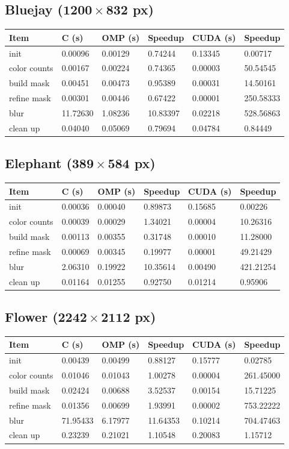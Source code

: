 \documentclass[12pt]{article}
\begin{document}
\subsection{Bluejay ($\mathbf{1200 \times 832}$ px)}

\begin{tabular}{l|l|l|l|l|l}
    Item & C (s) & OMP (s) & Speedup & CUDA (s) & Speedup
\\  \hline
    init & 0.00096 & 0.00129 & 0.74244 & 0.13345 & 0.00717
\\  color counts & 0.00167 & 0.00224 & 0.74365 & 0.00003 & 50.54545
\\  build mask & 0.00451 & 0.00473 & 0.95389 & 0.00031 & 14.50161
\\  refine mask & 0.00301 & 0.00446 & 0.67422 & 0.00001 & 250.58333
\\  blur & 11.72630 & 1.08236 & 10.83397 & 0.02218 & 528.56863
\\  clean up & 0.04040 & 0.05069 & 0.79694 & 0.04784 & 0.84449
\end{tabular}

\subsection{Elephant ($\mathbf{389 \times 584}$ px)}

\begin{tabular}{l|l|l|l|l|l}
    Item & C (s) & OMP (s) & Speedup & CUDA (s) & Speedup
\\  \hline
    init & 0.00036 & 0.00040 & 0.89873 & 0.15685 & 0.00226
\\  color counts & 0.00039 & 0.00029 & 1.34021 & 0.00004 & 10.26316
\\  build mask & 0.00113 & 0.00355 & 0.31748 & 0.00010 & 11.28000
\\  refine mask & 0.00069 & 0.00345 & 0.19977 & 0.00001 & 49.21429
\\  blur & 2.06310 & 0.19922 & 10.35614 & 0.00490 & 421.21254
\\  clean up & 0.01164 & 0.01255 & 0.92750 & 0.01214 & 0.95906
\end{tabular}

\subsection{Flower ($\mathbf{2242 \times 2112}$ px)}

\begin{tabular}{l|l|l|l|l|l}
    Item & C (s) & OMP (s) & Speedup & CUDA (s) & Speedup
\\  \hline
    init & 0.00439 & 0.00499 & 0.88127 & 0.15777 & 0.02785
\\  color counts & 0.01046 & 0.01043 & 1.00278 & 0.00004 & 261.45000
\\  build mask & 0.02424 & 0.00688 & 3.52537 & 0.00154 & 15.71225
\\  refine mask & 0.01356 & 0.00699 & 1.93991 & 0.00002 & 753.22222
\\  blur & 71.95433 & 6.17977 & 11.64353 & 0.10214 & 704.47463
\\  clean up & 0.23239 & 0.21021 & 1.10548 & 0.20083 & 1.15712
\end{tabular}
\end{document}
